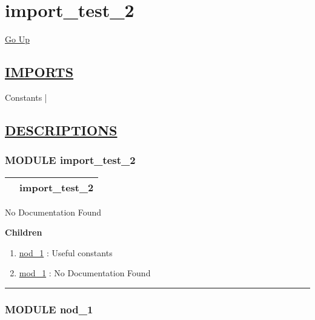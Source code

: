 \chapter*{\color{headfile}
import_test_2
}
\hypertarget{ecldoc:toc:import_test_2}{}
\hyperlink{ecldoc:toc:root}{Go Up}

\section*{\underline{\textsf{IMPORTS}}}
\begin{doublespace}
{\large
Constants |
}
\end{doublespace}

\section*{\underline{\textsf{DESCRIPTIONS}}}
\subsection*{\textsf{\colorbox{headtoc}{\color{white} MODULE}
import\_test\_2}}

\hypertarget{ecldoc:import_test_2}{}

{\renewcommand{\arraystretch}{1.5}
\begin{tabularx}{\textwidth}{|>{\raggedright\arraybackslash}l|X|}
\hline
\hspace{0pt}\mytexttt{\color{red} } & \textbf{import\_test\_2} \\
\hline
\end{tabularx}
}

\par





No Documentation Found







\textbf{Children}
\begin{enumerate}
\item \hyperlink{ecldoc:Constants}{nod\_1}
: Useful constants
\item \hyperlink{ecldoc:import_test_2.mod_1}{mod\_1}
: No Documentation Found
\end{enumerate}

\rule{\linewidth}{0.5pt}

\subsection*{\textsf{\colorbox{headtoc}{\color{white} MODULE}
nod\_1}}

